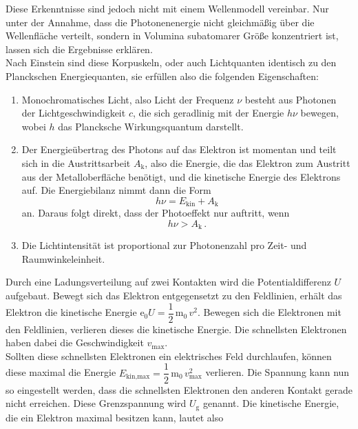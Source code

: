 Diese Erkenntnisse sind jedoch nicht mit einem Wellenmodell vereinbar.
Nur unter der Annahme, dass die Photonenenergie nicht gleichmäßig über die Wellenfläche verteilt,
sondern in Volumina subatomarer Größe konzentriert ist, lassen sich die Ergebnisse erklären. \\

Nach Einstein sind diese Korpuskeln, oder auch Lichtquanten identisch zu den Planckschen Energiequanten,
sie erfüllen also die folgenden Eigenschaften:

\begin{enumerate}
    \item Monochromatisches Licht, also Licht der Frequenz $\nu$ besteht aus Photonen der Lichtgeschwindigkeit $c$,
            die sich geradlinig mit der Energie $h\nu$ bewegen, wobei $h$ das Plancksche Wirkungsquantum darstellt.
    \item Der Energieübertrag des Photons auf das Elektron ist momentan und teilt sich in die Austrittsarbeit $A_\text{k}$, 
            also die Energie, die das Elektron zum Austritt aus der Metalloberfläche benötigt, 
            und die kinetische Energie des Elektrons auf. Die Energiebilanz nimmt dann die 
            Form
            \begin{equation}
                h \nu = E_\text{kin} + A_\text{k}
                \label{eq:energiebilanz}
            \end{equation}
            an.
            Daraus folgt direkt, dass der Photoeffekt nur auftritt, wenn
            \begin{equation*}
                h \nu > A_\text{k} \,.
            \end{equation*}
    \item Die Lichtintensität ist proportional zur Photonenzahl pro Zeit- und Raumwinkeleinheit.
\end{enumerate}

Durch eine Ladungsverteilung auf zwei Kontakten wird die Potentialdifferenz $U$ aufgebaut.
Bewegt sich das Elektron entgegensetzt zu den Feldlinien, erhält das Elektron die kinetische Energie $\text{e}_0 U = \dfrac{1}{2} \, \text{m}_0 \, v^2 $.
Bewegen sich die Elektronen mit den Feldlinien, verlieren dieses die kinetische Energie.
Die schnellsten Elektronen haben dabei die Geschwindigkeit $v_\text{max}$. \\
Sollten diese schnellsten Elektronen ein elektrisches Feld durchlaufen, können diese maximal die Energie $E_\text{kin,max} = \dfrac{1}{2} \, \text{m}_0 \, v^2_\text{max}$ verlieren.
Die Spannung kann nun so eingestellt werden, dass die schnellsten Elektronen den anderen Kontakt gerade nicht erreichen.
Diese Grenzspannung wird $U_\text{g}$ genannt. Die kinetische Energie, die ein Elektron maximal besitzen kann, lautet also

